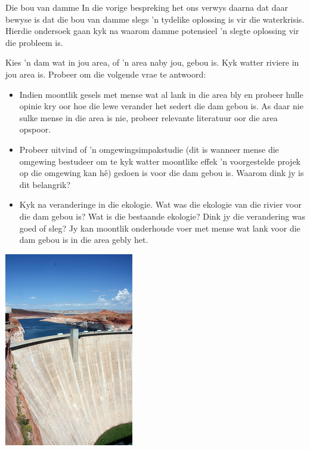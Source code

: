 \par 
\label{m38138*id0123}
\begin{Investigation}{Die bou van damme}
\nopagebreak\noindent
\label{m38138*id0128031}In die vorige bespreking het ons verwys daarna dat daar bewyse is dat die bou van damme slegs  'n tydelike oplossing is vir die waterkrisis. Hierdie ondersoek gaan kyk na waarom damme potensieel  'n slegte oplossing vir die probleem is.\par\noindent 
\label{m38138*id473692}Kies  'n dam wat in jou area, of  'n area naby jou, gebou is. Kyk watter riviere in jou area is. Probeer om die volgende vrae te antwoord: 
\begin{minipage}{.7\textwidth}\vspace{1em}
\label{m38138*id774}\begin{itemize}[noitemsep]
            \label{m38138*id034582}\item Indien moontlik gesels met mense wat al lank in die area bly en probeer hulle opinie kry oor hoe die lewe verander het sedert die dam gebou is. As daar nie sulke mense in die area is nie, probeer relevante literatuur oor die area opspoor.
\label{m38138*id08323}\item Probeer uitvind of  'n omgewingsimpakstudie (dit is wanneer mense die omgewing bestudeer om te kyk watter moontlike effek  'n voorgestelde projek op die omgewing kan hê) gedoen is voor die dam gebou is. Waarom dink jy is dit belangrik?
\label{m38138*id0832346}\item 
Kyk na veranderinge in die ekologie. Wat was die ekologie van die rivier voor die dam gebou is? Wat is die bestaande ekologie? Dink jy die verandering was goed of sleg? Jy kan moontlik onderhoude voer met mense wat lank voor die dam gebou is in die area gebly het. 
\end{itemize}
\vspace{1em}
\end{minipage}
\begin{minipage}{.3\textwidth}
 \begin{center}
  \includegraphics[height=.8\textwidth]{photos/Redeo.jpg} \\

\end{center}
\end{minipage}
\end{Investigation}
